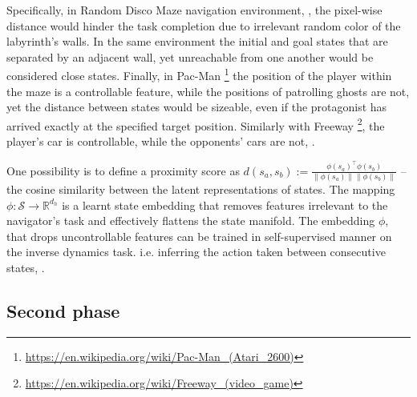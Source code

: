 \documentclass{article}
\begin{document}
Specifically, in Random Disco Maze navigation environment, \citep{badia_never_2020}, the pixel-wise distance would hinder the task completion due to irrelevant random color of the labyrinth's walls. In the same environment the initial and goal states that are separated by an adjacent wall, yet unreachable from one another would be considered close states. Finally, in Pac-Man%
\footnote{
    \url{https://en.wikipedia.org/wiki/Pac-Man_(Atari_2600)}
}
the position of the player within the maze is a controllable feature, while the positions of patrolling ghosts are not, yet the distance between states would be sizeable, even if the protagonist has arrived exactly at the specified target position.
%
Similarly with Freeway%
\footnote{
    \url{https://en.wikipedia.org/wiki/Freeway_(video_game)}
}, the player's car is controllable, while the opponents' cars are not, \citep[fig.~1]{choi_contingency-aware_2019}.


One possibility is to define a proximity score as $
    d(s_a, s_b) 
        := \frac{\phi(s_a)^\top \phi(s_b)}{\|\phi(s_a)\|\|\phi(s_b)\|}
$ -- the cosine similarity between the latent representations of states. The mapping $
    \phi \colon \mathcal{S} \to \mathbb{R}^{d_h}
$ is a learnt state embedding that removes features irrelevant to the navigator's task and effectively flattens the state manifold. The embedding $\phi$, that drops uncontrollable features can be trained in self-supervised manner on the inverse dynamics task. i.e. inferring the action taken between consecutive states, \citep{choi_contingency-aware_2019,badia_never_2020}.


\subsection{Second phase}
\end{document}
